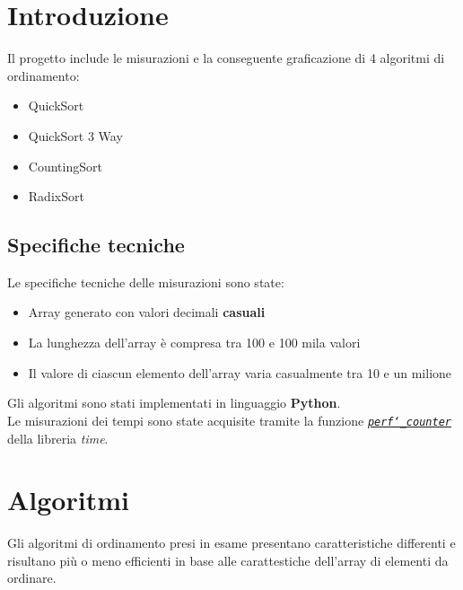 \documentclass[a4paper, 11pt]{article}
\newcommand{\myfrontpage}{%
  \begin{titlepage}
  \centering
  \preparefrontpage
  \end{titlepage}
}
\begin{document}
\myfrontpage

\thispagestyle{empty} 

\newpage

\tableofcontents
\newpage
\section{Introduzione}
Il progetto include le misurazioni e la conseguente graficazione di 4 algoritmi di ordinamento:
\begin{itemize}
    \item QuickSort
    \item QuickSort 3 Way
    \item CountingSort
    \item RadixSort
\end{itemize}
\subsection{Specifiche tecniche}
Le specifiche tecniche delle misurazioni sono state:
\begin{itemize}
    \item Array generato con valori decimali \textbf{casuali}
    \item La lunghezza dell'array è compresa tra 100 e 100 mila valori
    \item Il valore di ciascun elemento dell'array varia casualmente tra 10 e un milione
\end{itemize}
Gli algoritmi sono stati implementati in linguaggio \textbf{Python}. \\
Le misurazioni dei tempi sono state acquisite tramite la funzione \href{https://docs.python.org/3/library/time.html#time.perf_counter}{\textit{\texttt{perf\char`_counter}}} della libreria \textit{time}.

\section{Algoritmi}
Gli algoritmi di ordinamento presi in esame presentano caratteristiche differenti e risultano più o meno efficienti in base alle carattestiche dell'array di elementi da ordinare.
\end{document}

